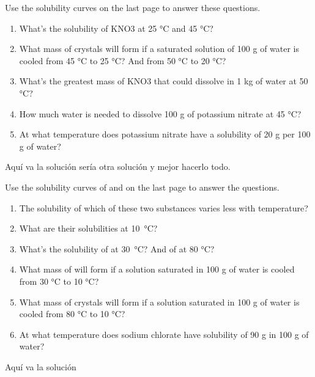 \begin{exercise}
    Use the solubility curves on the last page to answer these questions.
    \begin{enumerate}[label=\letraminuscula]
            \item What’s the solubility of KNO3 at 25 °C and 45 °C?
            \item What mass of  crystals will form if a saturated solution of 100 g of water is cooled from 45 °C to 25 °C? And from 50 °C to 20 °C?
            \item What’s the greatest mass of KNO3 that could dissolve in 1 kg of water at 50 °C?
            \item How much water is needed to dissolve 100 g of potassium nitrate at 45 °C?
            \item At what temperature does potassium nitrate have a solubility of 20 g per 100 g of water?
    \end{enumerate}
    \begin{solu}
        Aquí va la solución sería otra solución y mejor hacerlo todo.
    \end{solu}
\end{exercise}

\begin{exercise}
    Use the solubility curves of  and  on the last page to answer the questions.
    \begin{enumerate}[label=\letraminuscula]
            \item The solubility of which of these two substances varies less with temperature?
            \item What are their solubilities at \qty{10}{\celsius}?
            \item What’s the solubility of  at \qty{30}{\celsius}? And of  at 80 °C?
            \item What mass of  will form if a solution saturated in 100 g of water is cooled from
            30 °C to 10 °C?
            \item What mass of  crystals will form if a solution saturated in 100 g of water is cooled
            from 80 °C to 10 °C?
            \item At what temperature does sodium chlorate have solubility of 90 g in 100 g of water?
    \end{enumerate}
    \begin{solu}
        Aquí va la solución
    \end{solu}
\end{exercise}

